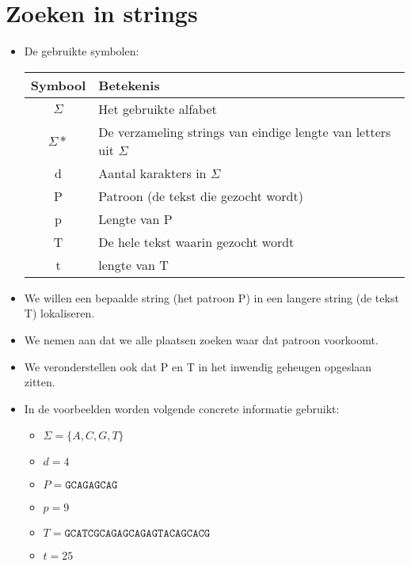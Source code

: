 \newcommand{\nonterminal}[1]{
    \langle \textbf{#1} \rangle
}

\newcommand{\m}[1]{
    {\color{OliveGreen}\bf#1}
}

\newcommand{\um}[1]{
    {\color{YellowOrange}\bf#1}
}

\newcommand{\nm}[1]{
    {\color{Maroon}\bf#1}
}
\chapter{Zoeken in strings}
\label{ch:zoeken_in_strings}
\begin{itemize}
    \item De gebruikte symbolen:

    \begin{table}[ht]
        \centering
        \begin{tabular}{c l}
            \hline
            Symbool & Betekenis \\
            \hline
            $\Sigma$ & Het gebruikte alfabet \\
            $\Sigma*$ & De verzameling strings van eindige lengte van letters uit $\Sigma$ \\
            d & Aantal karakters in $\Sigma$ \\
            P & Patroon (de tekst die gezocht wordt) \\
            p & Lengte van P \\
            T & De hele tekst waarin gezocht wordt\\
            t & lengte van T \\
            \hline
        \end{tabular}
    \end{table}

    \item We willen een bepaalde string (het patroon P) in een langere string (de tekst T) lokaliseren.
    \item We nemen aan dat we alle plaatsen zoeken waar dat patroon voorkoomt.
    \item We veronderstellen ook dat P en T in het inwendig geheugen opgeslaan zitten.

    \item In de voorbeelden worden volgende concrete informatie gebruikt:
    \begin{itemize}
        \item $\Sigma = \{A, C, G, T\}$
        \item $d = 4$
        \item $P = \texttt{GCAGAGCAG}$
        \item $p = 9$
        \item $T = \texttt{GCATCGCAGAGCAGAGTACAGCACG}$
        \item $t = 25$
    \end{itemize}

\end{itemize}



